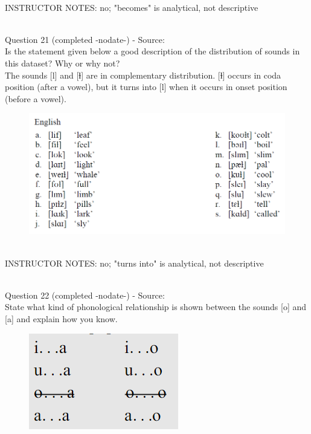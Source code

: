 \documentclass[12pt]{article}
\begin{document}
~\\
INSTRUCTOR NOTES: no; "becomes" is analytical, not descriptive


~\\

{\large Question 21} (completed -nodate-) - Source: \\

Is the statement given below a good description of the distribution of sounds in this dataset? Why or why not?\\

The sounds {[l]} and {[ɫ]} are in complementary distribution. {[ɫ]} occurs in coda position (after a vowel), but it turns into {[l]} when it occurs in onset position (before a vowel).

\begin{figure}[H]
\includegraphics{../images/english_laterals.png}
\end{figure}

~\\
INSTRUCTOR NOTES: no; "turns into" is analytical, not descriptive


~\\

{\large Question 22} (completed -nodate-) - Source: \\

State what kind of phonological relationship is shown between the sounds [o] and [a] and explain how you know.\\

\begin{figure}[H]
\includegraphics{../images/peng70ao_a.png}
\end{figure}
\end{document}
